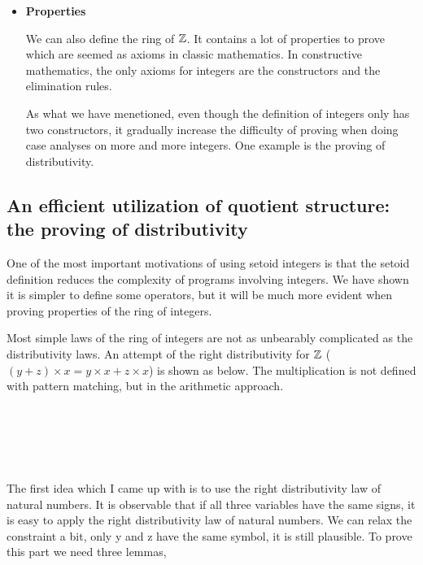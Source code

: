 \begin{itemize}
\item{\textbf{\large{Properties}}}

We can also define the ring of $\mathbb{Z}$. It contains a lot of properties
to prove which are seemed as axioms in classic mathematics. In
constructive mathematics, the only axioms for integers are the
constructors and the elimination rules.

As what we have menetioned, even though the definition of integers
only has two constructors, it gradually increase the difficulty of
proving when doing case analyses on more and more integers. One
example is the proving of distributivity.


\end{itemize}

\subsection{An efficient utilization of quotient structure: the
  proving of distributivity}

One of the most important motivations of using setoid integers is that
the setoid definition reduces the complexity of programs involving
integers. We have shown it is simpler to define some operators, but it
will be much more evident when proving properties of the ring of integers.

Most simple laws of the ring of integers are not as unbearably
complicated as the distributivity laws. An attempt of the right
distributivity for $\mathbb{Z}$ ($ (y + z) \times x = y \times x + z \times x$)
is shown as below. The multiplication is not defined with pattern
matching, but in the arithmetic approach.

\begin{code}
\\
\> \AgdaSymbol{:}     \<%
\\
\>   \AgdaSymbol{=}             \<%
\\
%
\\
\end{code}

The first idea which I came up
with is to use the right distributivity law of natural
numbers. It is observable that if all three variables have the same
signs, it is easy to apply the right distributivity law of natural
numbers. We can relax the constraint a bit, only y and z have the
same symbol, it is still plausible. To prove this part we need three
lemmas,

